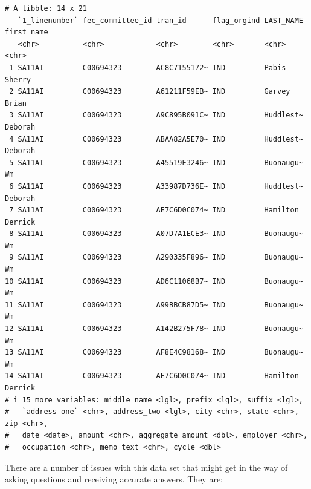 \documentclass[
  letterpaper,
  DIV=11,
  numbers=noendperiod]{scrreprt}
\begin{document}
\begin{verbatim}
# A tibble: 14 x 21
   `1_linenumber` fec_committee_id tran_id      flag_orgind LAST_NAME first_name
   <chr>          <chr>            <chr>        <chr>       <chr>     <chr>     
 1 SA11AI         C00694323        AC8C7155172~ IND         Pabis     Sherry    
 2 SA11AI         C00694323        A61211F59EB~ IND         Garvey    Brian     
 3 SA11AI         C00694323        A9C895B091C~ IND         Huddlest~ Deborah   
 4 SA11AI         C00694323        ABAA82A5E70~ IND         Huddlest~ Deborah   
 5 SA11AI         C00694323        A45519E3246~ IND         Buonaugu~ Wm        
 6 SA11AI         C00694323        A33987D736E~ IND         Huddlest~ Deborah   
 7 SA11AI         C00694323        AE7C6D0C074~ IND         Hamilton  Derrick   
 8 SA11AI         C00694323        A07D7A1ECE3~ IND         Buonaugu~ Wm        
 9 SA11AI         C00694323        A290335F896~ IND         Buonaugu~ Wm        
10 SA11AI         C00694323        AD6C11068B7~ IND         Buonaugu~ Wm        
11 SA11AI         C00694323        A99BBCB87D5~ IND         Buonaugu~ Wm        
12 SA11AI         C00694323        A142B275F78~ IND         Buonaugu~ Wm        
13 SA11AI         C00694323        AF8E4C98168~ IND         Buonaugu~ Wm        
14 SA11AI         C00694323        AE7C6D0C074~ IND         Hamilton  Derrick   
# i 15 more variables: middle_name <lgl>, prefix <lgl>, suffix <lgl>,
#   `address one` <chr>, address_two <lgl>, city <chr>, state <chr>, zip <chr>,
#   date <date>, amount <chr>, aggregate_amount <dbl>, employer <chr>,
#   occupation <chr>, memo_text <chr>, cycle <dbl>
\end{verbatim}

There are a number of issues with this data set that might get in the
way of asking questions and receiving accurate answers. They are:
\end{document}
